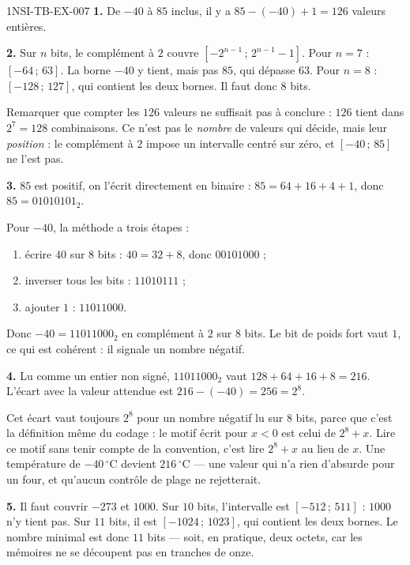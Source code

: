 \begin{corrige}{1NSI-TB-EX-007}
\textbf{1.} De $-40$ à $85$ inclus, il y a $85-(-40)+1=126$ valeurs entières.

\textbf{2.} Sur $n$ bits, le complément à $2$ couvre $[-2^{n-1}\,;\,2^{n-1}-1]$.
Pour $n=7$ : $[-64\,;\,63]$. La borne $-40$ y tient, mais pas $85$, qui dépasse
$63$. Pour $n=8$ : $[-128\,;\,127]$, qui contient les deux bornes. Il faut donc
$8$ bits.

Remarquer que compter les $126$ valeurs ne suffisait pas à conclure : $126$ tient
dans $2^7=128$ combinaisons. Ce n'est pas le \emph{nombre} de valeurs qui décide,
mais leur \emph{position} : le complément à $2$ impose un intervalle centré sur
zéro, et $[-40\,;\,85]$ ne l'est pas.

\textbf{3.} $85$ est positif, on l'écrit directement en binaire :
$85=64+16+4+1$, donc $85=01010101_2$.

Pour $-40$, la méthode a trois étapes :
\begin{enumerate}
  \item écrire $40$ sur $8$ bits : $40=32+8$, donc $00101000$ ;
  \item inverser tous les bits : $11010111$ ;
  \item ajouter $1$ : $11011000$.
\end{enumerate}
Donc $-40=11011000_2$ en complément à $2$ sur $8$ bits. Le bit de poids fort
vaut $1$, ce qui est cohérent : il signale un nombre négatif.

\textbf{4.} Lu comme un entier non signé, $11011000_2$ vaut
$128+64+16+8=216$. L'écart avec la valeur attendue est
$216-(-40)=256=2^8$.

Cet écart vaut toujours $2^8$ pour un nombre négatif lu sur $8$ bits, parce que
c'est la définition même du codage : le motif écrit pour $x<0$ est celui de
$2^8+x$. Lire ce motif sans tenir compte de la convention, c'est lire
$2^8+x$ au lieu de $x$. Une température de $-40\,^\circ$C devient $216\,^\circ$C
— une valeur qui n'a rien d'absurde pour un four, et qu'aucun contrôle de plage
ne rejetterait.

\textbf{5.} Il faut couvrir $-273$ et $1000$. Sur $10$ bits, l'intervalle est
$[-512\,;\,511]$ : $1000$ n'y tient pas. Sur $11$ bits, il est
$[-1024\,;\,1023]$, qui contient les deux bornes. Le nombre minimal est donc
$11$ bits — soit, en pratique, deux octets, car les mémoires ne se découpent pas
en tranches de onze.
\end{corrige}
